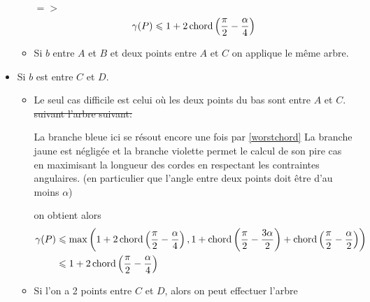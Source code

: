 \begin{itemize}
\begin{itemize}
\st{$=>$}$$\gamma(P) \leqslant 1 + 2\operatorname{chord}\left(\frac{\pi}{2} -
  \frac{\alpha}{4}\right)$$


\item \label{3cas13} Si $b$  entre $A$ et $B$ et deux points entre $A$
  et $C$ on applique le même arbre. 
  
\end{itemize}

\item \label{3cas2} Si $b$ est entre $C$ et $D$.

\begin{itemize}

\item \label{3cas21} Le seul cas difficile est celui où les deux points du bas sont entre $A$ et $C$.
\st{suivant l'arbre suivant:} 

La branche bleue ici se résout encore une fois par \ref{worstchord}
La branche jaune est négligée
et la branche violette permet le calcul de son pire cas en maximisant la longueur des cordes en respectant les contraintes angulaires. (en particulier que l'angle entre deux points doit être d'au moins $\alpha$)

on obtient alors
\begin{align*}
\gamma(P) &\leqslant \max\left(1+2\operatorname{chord}\left(\frac{\pi}{2} - \frac{\alpha}{4}\right), 1 + \operatorname{chord}\left(\frac{\pi}{2} - \frac{3\alpha}{2}\right) + \operatorname{chord}\left(\frac{\pi}{2} - \frac{\alpha}{2}\right)\right) \\
&\leqslant 1+2\operatorname{chord}\left(\frac{\pi}{2} - \frac{\alpha}{4}\right)
\end{align*}

\item \label{3cas22} Si l'on a 2 points entre $C$ et $D$, alors on peut
  effectuer l'arbre 


\end{itemize}
\end{itemize}
